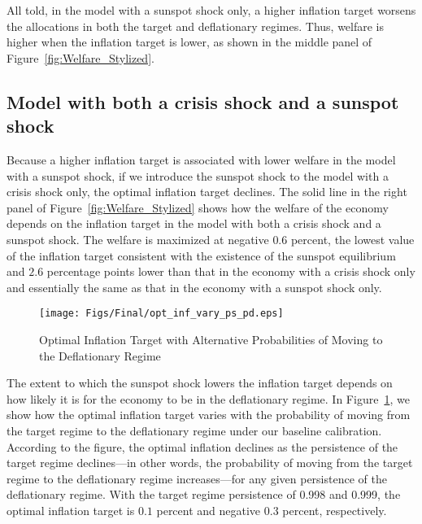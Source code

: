 \documentclass[11pt]{article}
\begin{document}
	All told, in the model with a sunspot shock only, a higher inflation target worsens the allocations in both the target and deflationary regimes. Thus, welfare is higher when the inflation target is lower, as shown in the middle panel of Figure~\ref{fig:Welfare_Stylized}.
	
	\subsection{Model with both a crisis shock and a sunspot shock}
	
	Because a higher inflation target is associated with lower welfare in the model with a sunspot shock, if we introduce the sunspot shock to the model with a crisis shock only, the optimal inflation target declines. The solid line in the right panel of Figure~\ref{fig:Welfare_Stylized} shows how the welfare of the economy depends on the inflation target in the model with both a crisis shock and a sunspot shock. The welfare is maximized at negative $0.6$ percent, the lowest value of the inflation target consistent with the existence of the sunspot equilibrium and $2.6$ percentage points lower than that in the economy with a crisis shock only and essentially the same as that in the economy with a sunspot shock only.
	
	\begin{figure}[!h]
		\begin{center}
			\caption{Optimal Inflation Target with Alternative Probabilities of Moving to the Deflationary Regime\label{fig:OptimalPiTarg_Stylized}}
			\texttt{[image: Figs/Final/opt\_inf\_vary\_ps\_pd.eps]}\\
		\end{center}
	\end{figure}
	
	The extent to which the sunspot shock lowers the inflation target depends on how likely it is for the economy to be in the deflationary regime. In Figure~\ref{fig:OptimalPiTarg_Stylized}, we show how the optimal inflation target varies with the probability of moving from the target regime to the deflationary regime under our baseline calibration. According to the figure, the optimal inflation declines as the persistence of the target regime declines---in other words, the probability of moving from the target regime to the deflationary regime increases---for any given persistence of the deflationary regime. With the target regime persistence of 0.998 and 0.999, the optimal inflation target is $0.1$ percent and negative $0.3$ percent, respectively. %
	
\end{document}
